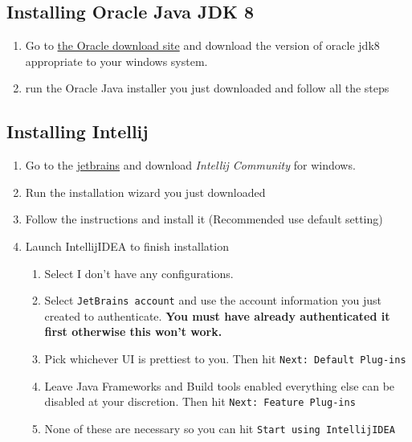 \documentclass[../setup.tex]{subfiles}
\begin{document}
\subsection{Installing Oracle Java JDK 8}

  \begin{enumerate}
    \item Go to \href{http://www.oracle.com/technetwork/java/javase/downloads/jdk8-downloads-2133151.html} {the
    Oracle download site} and download the version of oracle jdk8 appropriate to your windows system.

    \item run the Oracle Java installer you just downloaded and follow all the steps
  \end{enumerate}

\subsection{Installing Intellij}
  \begin{enumerate}
    \item Go to the \href{https://www.jetbrains.com/idea/download/index.html} {jetbrains} and download
    \textit{Intellij Community} for windows.

    \item Run the installation wizard you just downloaded \item Follow the instructions and install it
    (Recommended use default setting)

    \item Launch IntellijIDEA to finish installation
    \begin{enumerate}
      \item Select I don't have any configurations.
      \item Select \texttt{JetBrains account} and use the account information you just created to
      authenticate. \textbf{You must have already authenticated it first otherwise this won't work.}
      \item Pick whichever UI is prettiest to you. Then hit \texttt{Next: Default Plug-ins}
      \item Leave Java Frameworks and Build tools enabled everything else can be disabled at your discretion.
      Then hit \texttt{Next: Feature Plug-ins}
      \item None of these are necessary so you can hit \texttt{Start using IntellijIDEA}
    \end{enumerate}
  \end{enumerate}
\end{document}

